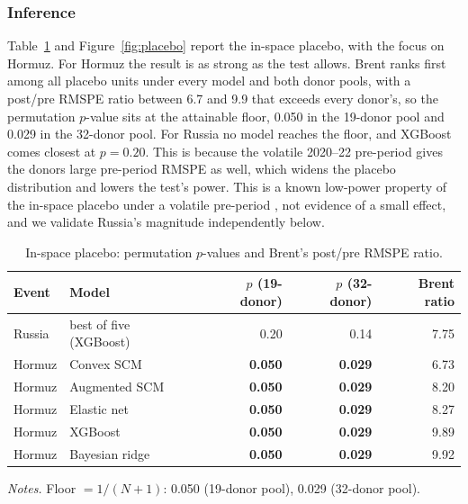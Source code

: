 \subsubsection{Inference}
Table~\ref{tab:placebo} and Figure~\ref{fig:placebo} report the in-space placebo, with the
focus on Hormuz. For Hormuz the result is as strong as the test allows. Brent ranks first among all
placebo units under every model and both donor pools, with a post/pre RMSPE ratio between
6.7 and 9.9 that exceeds every donor's, so the permutation $p$-value sits at the
attainable floor, 0.050 in the 19-donor pool and 0.029 in the 32-donor pool. For Russia no model reaches the floor, and XGBoost comes closest at $p=0.20$. This is because the volatile 2020--22 pre-period gives the donors large pre-period
RMSPE as well, which widens the placebo distribution and lowers the test's power. This is a
known low-power property of the in-space placebo under a volatile pre-period
\citep{abadie2010}, not evidence of a small effect, and we validate Russia's magnitude
independently below.

\begin{table}[h]
\centering
\caption{In-space placebo: permutation $p$-values and Brent's post/pre RMSPE ratio.}
\label{tab:placebo}
\begin{threeparttable}
\small
\begin{tabular}{@{}llrrr@{}}
\toprule
Event & Model & $p$ (19-donor) & $p$ (32-donor) & Brent ratio \\
\midrule
Russia & best of five (XGBoost) & 0.20 & 0.14 & 7.75 \\
\addlinespace
Hormuz & Convex SCM     & \textbf{0.050} & \textbf{0.029} & 6.73 \\
Hormuz & Augmented SCM  & \textbf{0.050} & \textbf{0.029} & 8.20 \\
Hormuz & Elastic net    & \textbf{0.050} & \textbf{0.029} & 8.27 \\
Hormuz & XGBoost        & \textbf{0.050} & \textbf{0.029} & 9.89 \\
Hormuz & Bayesian ridge & \textbf{0.050} & \textbf{0.029} & 9.92 \\
\bottomrule
\end{tabular}
\begin{tablenotes}[flushleft]
\footnotesize
\item \textit{Notes.} Floor $=1/(N{+}1)$: 0.050 (19-donor pool), 0.029 (32-donor pool).
\end{tablenotes}
\end{threeparttable}
\end{table}

